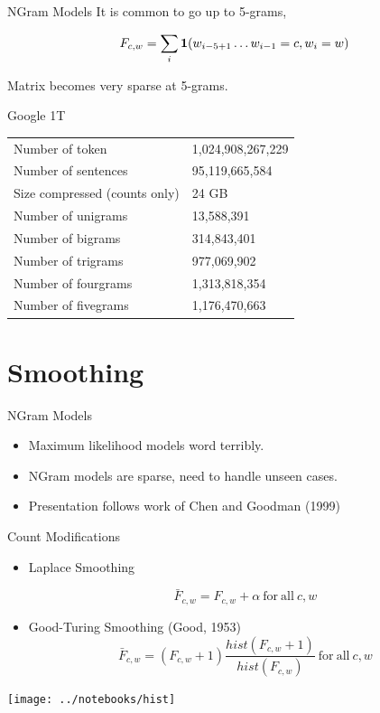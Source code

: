 \documentclass{beamer}
\begin{document}
\begin{frame}{NGram Models}
  It is common to go up to 5-grams,

  \[ F_{c, w}  =  \sum_{i} \mathbf{1}(w_{i-5+1} \ldots w_{i-1} = c, w_{i} = w)  \]

  Matrix becomes very sparse at 5-grams. 
\end{frame}

\begin{frame}{Google 1T}

  \begin{table}
    \centering
  \begin{tabular}{ll}
    \toprule
    Number of token  &1,024,908,267,229 \\
    Number of sentences & 95,119,665,584 \\
    Size compressed (counts only) & 24 GB \\  
    \midrule
    Number of unigrams & 13,588,391 \\
    Number of bigrams & 314,843,401 \\ 
    Number of trigrams & 977,069,902 \\ 
    Number of fourgrams & 1,313,818,354 \\
    Number of fivegrams&  1,176,470,663 \\
    \bottomrule
  \end{tabular}
  \end{table}
\end{frame}

\section{Smoothing}

\begin{frame}{NGram Models}
  \begin{itemize}
  \item Maximum likelihood models word terribly.
    \air 

  \item NGram models are  sparse, need to handle unseen cases.

    \air
    

  \item Presentation follows work of Chen and Goodman (1999)
  \end{itemize}
\end{frame}

\begin{frame}{Count Modifications}
  \begin{itemize}
  \item Laplace Smoothing 

  \[ \bar{F}_{c, w}  =F_{c, w}  + \alpha   \mathrm{\ for\ all \  } c, w\]

  \item Good-Turing Smoothing (Good, 1953)
    \[ \bar{F}_{c, w} =  (F_{c, w}  + 1) \frac{hist(F_{c, w}+1)}{hist(F_{c, w})}   \mathrm{\ for\ all \  } c, w\]
  \end{itemize}
    \begin{center}
      \texttt{[image: ../notebooks/hist]}
    \end{center}

\end{frame}
\end{document}
